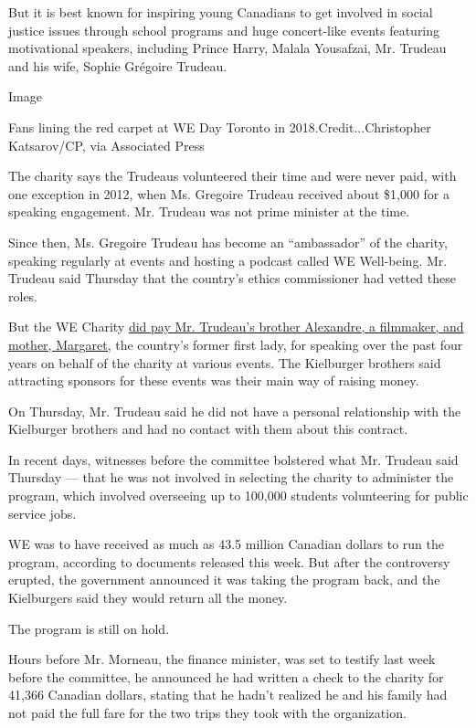 But it is best known for inspiring young Canadians to get involved in
social justice issues through school programs and huge concert-like
events featuring motivational speakers, including Prince Harry, Malala
Yousafzai, Mr. Trudeau and his wife, Sophie Grégoire Trudeau.

Image

Fans lining the red carpet at WE Day Toronto in
2018.Credit...Christopher Katsarov/CP, via Associated Press

The charity says the Trudeaus volunteered their time and were never
paid, with one exception in 2012, when Ms. Gregoire Trudeau received
about \$1,000 for a speaking engagement. Mr. Trudeau was not prime
minister at the time.

Since then, Ms. Gregoire Trudeau has become an ``ambassador'' of the
charity, speaking regularly at events and hosting a podcast called WE
Well-being. Mr. Trudeau said Thursday that the country's ethics
commissioner had vetted these roles.

But the WE Charity
\href{https://www.nytimes3xbfgragh.onion/2020/07/09/world/canada/trudeau-ethics-charity.html}{did
pay Mr. Trudeau's brother Alexandre, a filmmaker, and mother, Margaret,}
the country's former first lady, for speaking over the past four years
on behalf of the charity at various events. The Kielburger brothers said
attracting sponsors for these events was their main way of raising
money.

On Thursday, Mr. Trudeau said he did not have a personal relationship
with the Kielburger brothers and had no contact with them about this
contract.

In recent days, witnesses before the committee bolstered what Mr.
Trudeau said Thursday --- that he was not involved in selecting the
charity to administer the program, which involved overseeing up to
100,000 students volunteering for public service jobs.

WE was to have received as much as 43.5 million Canadian dollars to run
the program, according to documents released this week. But after the
controversy erupted, the government announced it was taking the program
back, and the Kielburgers said they would return all the money.

The program is still on hold.

Hours before Mr. Morneau, the finance minister, was set to testify last
week before the committee, he announced he had written a check to the
charity for 41,366 Canadian dollars, stating that he hadn't realized he
and his family had not paid the full fare for the two trips they took
with the organization.

